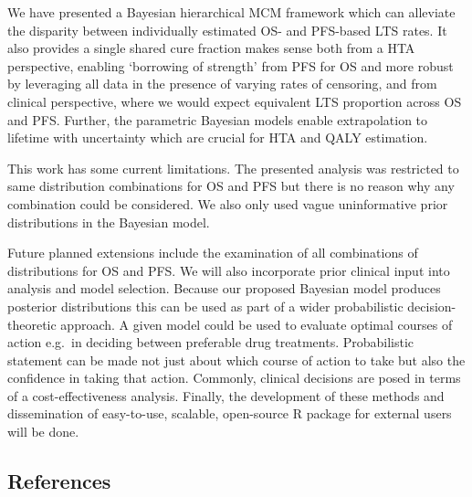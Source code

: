 \documentclass[
]{article}
\begin{document}
We have presented a Bayesian hierarchical MCM framework which can
alleviate the disparity between individually estimated OS- and PFS-based
LTS rates. It also provides a single shared cure fraction makes sense
both from a HTA perspective, enabling `borrowing of strength' from PFS
for OS and more robust by leveraging all data in the presence of varying
rates of censoring, and from clinical perspective, where we would expect
equivalent LTS proportion across OS and PFS. Further, the parametric
Bayesian models enable extrapolation to lifetime with uncertainty which
are crucial for HTA and QALY estimation.

This work has some current limitations. The presented analysis was
restricted to same distribution combinations for OS and PFS but there is
no reason why any combination could be considered. We also only used
vague uninformative prior distributions in the Bayesian model.

Future planned extensions include the examination of all combinations of
distributions for OS and PFS. We will also incorporate prior clinical
input into analysis and model selection. Because our proposed Bayesian
model produces posterior distributions this can be used as part of a
wider probabilistic decision-theoretic approach. A given model could be
used to evaluate optimal courses of action e.g.~in deciding between
preferable drug treatments. Probabilistic statement can be made not just
about which course of action to take but also the confidence in taking
that action. Commonly, clinical decisions are posed in terms of a
cost-effectiveness analysis. Finally, the development of these methods
and dissemination of easy-to-use, scalable, open-source R package for
external users will be done.

\newpage

\hypertarget{references}{%
\subsection*{References}\label{references}}
\end{document}
